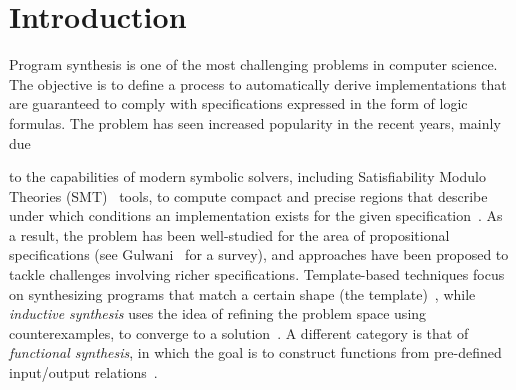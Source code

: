 
\section{Introduction}

Program synthesis is one of the most challenging problems in computer science. The objective is to define a process to automatically derive implementations that are guaranteed to comply with specifications expressed in the form of logic formulas. The problem has seen increased popularity in the recent years, mainly due
\iffalse
 Program synthesis owes its origins to Church~\cite{church1962logic} (otherwise known as Church's Problem), and has long been an important area of research.
%
%
After the seminal paper by Pnueli and Rosner~\cite{pnueli1989synthesis} on reactive synthesis, the problem has seen increased popularity 
\grigory{Actually, the synthesis got popular after the death of Pnueli. Pnueli himself was very skeptical about this idea.}
\fi
to the capabilities of modern symbolic solvers, including Satisfiability Modulo Theories (SMT)~\cite{BarFT-SMTLIB} tools, to compute compact and precise regions that describe under which conditions an implementation exists for the given specification~\cite{reynolds2015counterexample}.
 As a result, the problem has been well-studied for the area of propositional specifications (see Gulwani~\cite{gulwani2010dimensions} for a survey), and approaches have been proposed to tackle challenges involving richer specifications. Template-based techniques focus on synthesizing programs that
match a certain shape (the template)~\cite{srivastava2013template}, while {\em inductive synthesis} uses the idea of refining the problem space using counterexamples, to converge to a solution~\cite{flener2001inductive}. 
A different category is that of \textit{functional synthesis}, in which the goal is to construct functions from pre-defined input/output relations~\cite{kuncak2013functional}.

